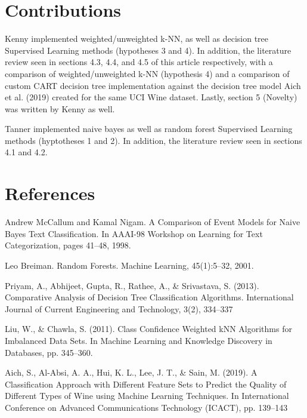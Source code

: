 \documentclass{article}
\theoremstyle{plain}
\theoremstyle{definition}
\theoremstyle{remark}
\begin{document}
\section{Contributions}

Kenny implemented weighted/unweighted k-NN, as well as decision tree Supervised Learning methods (hypotheses 3 and 4). In addition, the literature review seen in sections 4.3, 4.4, and 4.5 of this article respectively, with a comparison of weighted/unweighted k-NN (hypothesis 4) and a comparison of custom CART decision tree implementation against the decision tree model Aich et al. (2019) created for the same UCI Wine dataset. Lastly, section 5 (Novelty) was written by Kenny as well.

Tanner implemented naive bayes as well as random forest Supervised Learning methods (hyptotheses 1 and 2). In addition, the literature review seen in sections 4.1 and 4.2. 
\newpage

\section{References}

Andrew McCallum and Kamal Nigam. A Comparison of Event Models for Naive Bayes Text Classification.
In AAAI-98 Workshop on Learning for Text Categorization, pages 41--48, 1998.

Leo Breiman. Random Forests.
Machine Learning, 45(1):5--32, 2001.

Priyam, A., Abhijeet, Gupta, R., Rathee, A., \& Srivastava, S. (2013). Comparative Analysis of Decision Tree Classification Algorithms. International
Journal of Current Engineering and Technology, 3(2), 334–337

Liu, W., \& Chawla, S. (2011). Class Confidence Weighted kNN Algorithms for Imbalanced Data Sets. In Machine Learning and Knowledge Discovery in Databases, pp. 345–360.

Aich, S., Al-Absi, A. A., Hui, K. L., Lee, J. T., \& Sain, M. (2019). A Classification Approach with Different Feature Sets to Predict the Quality of
Different Types of Wine using Machine Learning Techniques. In International Conference on Advanced Communications Technology (ICACT), pp. 139–143
\end{document}
